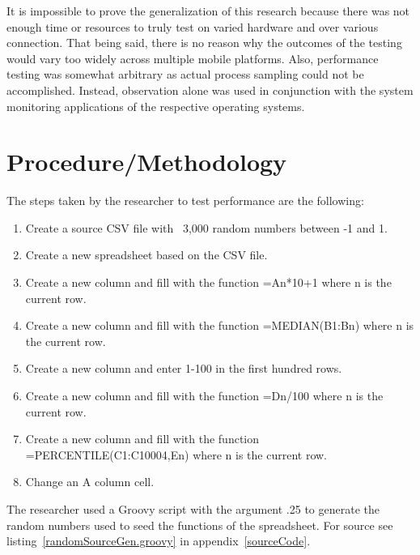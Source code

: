 



It is impossible to prove the generalization of this research because there was
not enough time or resources to truly test on varied hardware and over various
connection.  That being said, there is no reason why the outcomes of the testing
would vary too widely across multiple mobile platforms.  Also, performance
testing was somewhat arbitrary as actual process sampling could not be
accomplished.  Instead, observation alone was used in conjunction with the
system monitoring applications of the respective operating systems.

\section{Procedure/Methodology}


The steps taken by the researcher to test performance are the following:

\begin{enumerate}

\item Create a source CSV file with ~3,000 random numbers between -1 and 1.

\item Create a new spreadsheet based on the CSV file.

\item Create a new column and fill with the function =An*10+1 where n is the
  current row.

\item Create a new column and fill with the function =MEDIAN(B1:Bn) where n is
  the current row.

\item Create a new column and enter 1-100 in the first hundred rows.

\item Create a new column and fill with the function =Dn/100 where n is the
  current row.

\item Create a new column and fill with the function =PERCENTILE(C1:C10004,En)
  where n is the current row.

\item Change an A column cell.

\end{enumerate}

The researcher used a Groovy script with the argument .25 to generate the random
numbers used to seed the functions of the spreadsheet.  For source
see listing~\ref{randomSourceGen.groovy} in appendix~\ref{sourceCode}.

